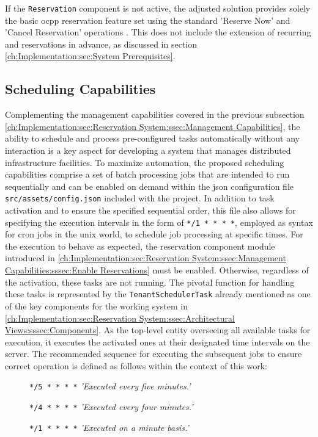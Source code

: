 \noindent If the \texttt{Reservation} component is not active, the adjusted solution provides solely the basic \acrshort{ocpp} reservation feature set using the standard 'Reserve Now' and 'Cancel Reservation' operations \cite{noauthor_ocpp_nodate}. This does not include the extension of recurring and reservations in advance, as discussed in section \ref{ch:Implementation:sec:System Prerequisites}.

\subsection{Scheduling Capabilities}
\label{ch:Implementation:sec:Reservation System:ssec:Scheduling Capabilities}

Complementing the management capabilities covered in the previous subsection \ref{ch:Implementation:sec:Reservation System:ssec:Management Capabilities}, the ability to schedule and process pre-configured tasks automatically without any interaction is a key aspect for developing a system that manages distributed infrastructure facilities. 
To maximize automation, the proposed scheduling capabilities comprise a set of batch processing jobs that are intended to run sequentially and can be enabled on demand within the \acrshort{json} configuration file \texttt{src/assets/config.json} included with the project. 
In addition to task activation and to ensure the specified sequential order, this file also allows for specifying the execution intervals in the form of \texttt{*/1 * * * *}, employed as syntax for \gls{cron} jobs in the \gls{unix} world, to schedule job processing at specific times.
For the execution to behave as expected, the reservation component module introduced in \ref{ch:Implementation:sec:Reservation System:ssec:Management Capabilities:sssec:Enable Reservations} must be enabled. Otherwise, regardless of the activation, these tasks are not running.
The pivotal function for handling these tasks is represented by the \texttt{TenantSchedulerTask} already mentioned as one of the key components for the working system in \ref{ch:Implementation:sec:Reservation System:ssec:Architectural Views:sssec:Components}.
As the top-level entity overseeing all available tasks for execution, it executes the activated ones at their designated time intervals on the server.
The recommended sequence for executing the subsequent jobs to ensure correct operation is defined as follows within the context of this work:
\begin{description}
    \item[]{ \texttt{*/5 * * * *} \quad \textit{'Executed every five minutes.'}}
    \item[]{ \texttt{*/4 * * * *} \quad \textit{'Executed every four minutes.'}}
    \item[]{ \texttt{*/1 * * * *} \quad \textit{'Executed on a minute basis.'}}
\end{description}

